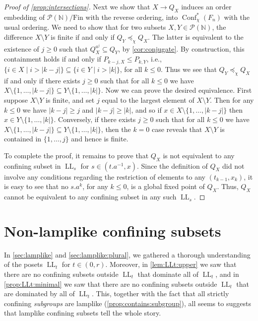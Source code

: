 \documentclass[reqno,12pt]{amsart}\setcounter{tocdepth}{1}
\theoremstyle{definition}
\newcommand{\N}{\mathbb{N}}
\DeclareMathOperator{\Conf}{Conf}
\DeclareMathOperator{\LL}{LL}
\numberwithin{equation}{section}
\begin{document}
\begin{proof}[Proof of \cref{prop:intersections}]
Next we show that $X \to Q_X$ induces an order embedding of $\mathcal{P}(\N)/\mathrm{Fin}$ with the reverse ordering, into $\Conf^\ast_\chi(F_n)$ with the usual ordering. We need to show that for two subsets $X, Y \in \mathcal{P}(\N)$, the difference $X \setminus Y$ is finite if and only if $Q_Y \preceq_\chi Q_X$. The latter is equivalent to the existence of $j \geq 0$ such that $Q_X^{a^j} \subseteq Q_Y$, by \cref{cor:conjugate}. By construction, this containment holds if and only if $P_{k-j,X} \leq P_{k,Y}$, i.e., $\{ i \in X \mid i > |k-j| \} \subseteq \{ i \in Y \mid i > |k| \}$, for all $k\le 0$. Thus we see that $Q_Y \preceq_\chi Q_X$ if and only if there exists $j\ge 0$ such that for all $k\le 0$ we have $X \setminus \{1, \ldots, |k-j| \} \subseteq Y \setminus \{1, \ldots, |k| \}$. Now we can prove the desired equivalence. First suppose $X\setminus Y$ is finite, and set $j$ equal to the largest element of $X\setminus Y$. Then for any $k\le 0$ we have $|k-j|\ge j$ and $|k-j|\ge |k|$, and so if $x\in X \setminus \{1, \ldots, |k-j| \}$ then $x\in Y\setminus \{1, \ldots, |k| \}$. Conversely, if there exists $j\ge 0$ such that for all $k\le 0$ we have $X \setminus \{1, \ldots, |k-j| \} \subseteq Y \setminus \{1, \ldots, |k| \}$, then the $k=0$ case reveals that $X\setminus Y$ is contained in $\{1,\dots,j\}$ and hence is finite.

To complete the proof, it remains to prove that $Q_X$ is not equivalent to any confining subset in $\LL_s$ for $s\in (t.a^{-1},x)$. Since the definition of $Q_X$ did not involve any conditions regarding the restriction of elements to any $(t_{k-1},x_k)$, it is easy to see that no $s.a^k$, for any $k\le 0$, is a global fixed point of $Q_X$. Thus, $Q_X$ cannot be equivalent to any confining subset in any such $\LL_s$.
\end{proof}


\section{Non-lamplike confining subsets}\label{sec:moving}

In \cref{sec:lamplike} and \cref{sec:lamplike:plural}, we gathered a thorough understanding of the posets $\LL_t$ for $t \in (0, r)$. Moreover, in \cref{lem:LLt:upper} we saw that there are no confining subsets outside $\LL_t$ that dominate all of $\LL_t$, and in \cref{prop:LLt:minimal} we saw that there are no confining subsets outside $\LL_t$ that are dominated by all of $\LL_t$. This, together with the fact that all strictly confining \emph{subgroups} are lamplike (\cref{prop:contains:subgroup}), all seems to suggests that lamplike confining subsets tell the whole story.
\end{document}

